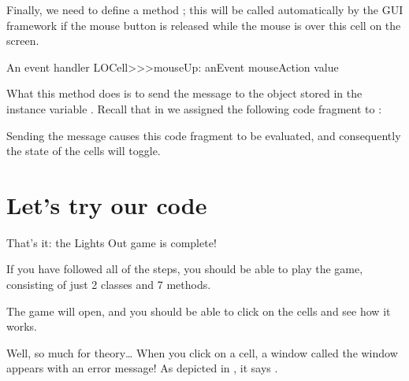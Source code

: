 \documentclass[a4paper,10pt,twoside]{book}
\begin{document}

Finally, we need to define a method ; this will be called automatically by the GUI framework if the mouse button is released while the mouse is over this cell on the screen.

\begin{method}[sbecellmouseup]{An event handler}
LOCell>>>mouseUp: anEvent
   mouseAction value
\end{method}


What this method does is to send the message  to the object stored in the instance variable . 
Recall that in  we assigned the following code fragment to :


\noindent
Sending the  message causes this code fragment to be evaluated, and consequently the state of the cells will toggle.

\section{Let's try our code}

That's it: the Lights Out game is complete!

If you have followed all of the steps, you should be able to play the game, consisting of just 2 classes and 7 methods.


The game will open, and you should be able to click on the cells and see how it works.

Well, so much for theory\ldots{}
When you click on a cell, a  window called the window appears with an error message!
As depicted in , it says .
\end{document}
